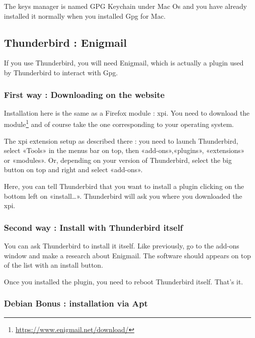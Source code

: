 The keys manager is named GPG Keychain under Mac Os and you have already
installed it normally when you installed Gpg for Mac.

\subsection{Thunderbird : Enigmail}\label{thunderbird-enigmail}

If you use Thunderbird, you will need Enigmail, which is actually a
plugin used by Thunderbird to interact with Gpg.

\subsubsection{First way : Downloading on the website}\label{first-way-downloading-on-the-website}

Installation here is the same as a Firefox module : xpi. You need to
download the module\footnote{\url{https://www.enigmail.net/download/}} and
of course take the one corresponding to your operating system.

The xpi extension setup as described there : you need to launch
Thunderbird, select «Tools» in the menus bar on top, then
«add-ons»,«plugins», «extensions» or «modules». Or, depending on your
version of Thunderbird, select the big button on top and right and
select «add-ons».

Here, you can tell Thunderbird that you want to install a plugin
clicking on the bottom left on «install\ldots{}». Thunderbird will ask
you where you downloaded the xpi.

\subsubsection{Second way : Install with Thunderbird itself}\label{second-way-install-with-thunderbird-itself}

You can ask Thunderbird to install it itself. Like previously, go to the add-ons window and make a research about
Enigmail. The software should appears on top of the list with an install
button.

Once you installed the plugin, you need to reboot Thunderbird itself.
That's it.

\subsubsection{Debian Bonus : installation via Apt}\label{debian-bonus-installation-via-apt}

